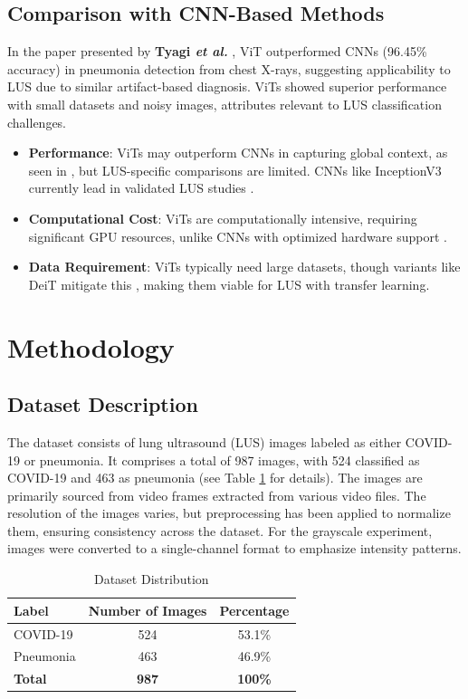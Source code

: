\documentclass[12pt, a4paper]{article}
\begin{document}
\subsection{Comparison with CNN-Based Methods}
In the paper presented by \textbf{Tyagi \textit{et al.}} \cite{tyagi}, ViT outperformed CNNs (96.45\% accuracy) in pneumonia detection from chest X-rays, suggesting applicability to LUS due to similar artifact-based diagnosis. ViTs showed superior performance with small datasets and noisy images, attributes relevant to LUS classification challenges.
\begin{itemize}
\item \textbf{Performance}: ViTs may outperform CNNs in capturing global context, as seen in \cite{tyagi}, but LUS-specific comparisons are limited. CNNs like InceptionV3 currently lead in validated LUS studies \cite{diaz}.
\item \textbf{Computational Cost}: ViTs are computationally intensive, requiring significant GPU resources, unlike CNNs with optimized hardware support \cite{vafaeezadeh}.
\item \textbf{Data Requirement}: ViTs typically need large datasets, though variants like DeiT mitigate this \cite{touvron}, making them viable for LUS with transfer learning.
\end{itemize}


\section{Methodology}
\label{sec:methodology}

\subsection{Dataset Description}
The dataset consists of lung ultrasound (LUS) images labeled as either COVID-19 or pneumonia. It comprises a total of 987 images, with 524 classified as COVID-19 and 463 as pneumonia (see Table \ref{tab:dataset_distribution} for details). The images are primarily sourced from video frames extracted from various video files. The resolution of the images varies, but preprocessing has been applied to normalize them, ensuring consistency across the dataset. For the grayscale experiment, images were converted to a single-channel format to emphasize intensity patterns.
\begin{table}[h]
\centering
\begin{tabular}{lcc}
\hline
\textbf{Label} & \textbf{Number of Images} & \textbf{Percentage} \\ \hline
COVID-19       & 524                      & 53.1\%             \\ 
Pneumonia      & 463                      & 46.9\%             \\ 
\textbf{Total} & \textbf{987}             & \textbf{100\%}     \\ \hline
\end{tabular}
\caption{Dataset Distribution}
\label{tab:dataset_distribution}
\end{table}
\end{document}
